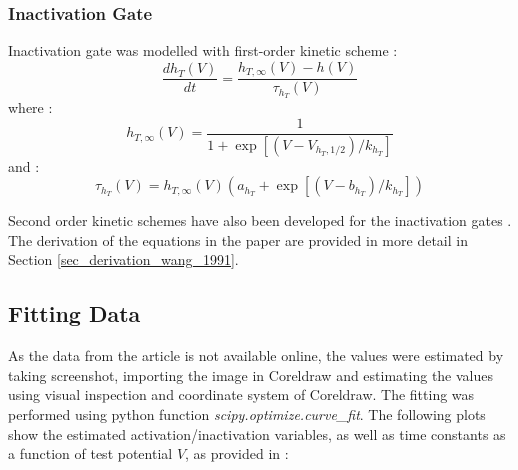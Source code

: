 \documentclass[../../workflow.tex]{subfiles}
\begin{document}
\subsubsection{Inactivation Gate}

Inactivation gate was modelled with first-order kinetic scheme
\cite{destexheVivoVitroComputational1996, destexheSynthesisModelsExcitable1994}:
\begin{equation*}
    \frac{dh_T(V)}{dt} = \frac{h_{T,\infty}(V) - h(V)}{\tau_{h_T}(V)}
\end{equation*}
where \cite{destexheVivoVitroComputational1996, wangModelTtypeCalcium1991}:
\begin{equation}\label{eq_model_r5_t_type_steady_state_inactivation}
    h_{T,\infty}(V) = \frac{1}{1 + \exp{[(V - V_{h_T,1/2})/k_{h_T}]}}
\end{equation}
and \cite{wangMultipleDynamicalModes1994}:
\begin{equation}\label{eq_model_r5_t_type_tau_inactivation}
    \tau_{h_T}(V) = h_{T,\infty}(V)(a_{h_T} + \exp{[(V - b_{h_T})/k_{h_T}]})
\end{equation}

\begin{note}
    Second order kinetic schemes have also been developed for the inactivation gates
    \cite{wangModelTtypeCalcium1991}. The derivation of the equations in the paper are provided in
    more detail in Section \ref{sec_derivation_wang_1991}.
\end{note}


\subsection{Fitting Data}

As the data from the article is not available online, the values were estimated by taking screenshot,
importing the image in Coreldraw and estimating the values using visual inspection and coordinate
system of Coreldraw. The fitting was performed using python function \textit{scipy.optimize.curve\_fit}.
The following plots show the estimated activation/inactivation variables, as well as time constants
as a function of test potential $V$, as provided in \cite{jeongCaa1TFlyTtype2015}:
\end{document}
